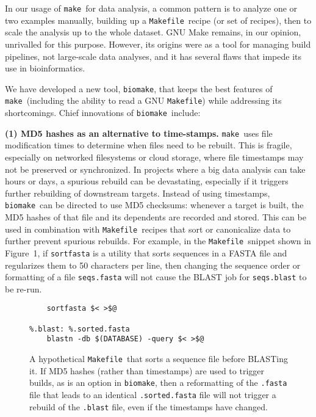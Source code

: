 \documentclass{bioinfo}
\newcommand\Makefile{{\tt Makefile}}
\newcommand\make{{\tt make}}
\newcommand\biomake{{\tt biomake}}
\begin{document}
In our usage of \make\ for data analysis, a common pattern is to analyze one or two examples manually, building up a \Makefile\ recipe (or set of recipes),
then to scale the analysis up to the whole dataset.
GNU Make remains, in our opinion, unrivalled for this purpose.
However, its origins were as a tool for managing build pipelines, not large-scale data analyses, and it has several flaws that impede its use in bioinformatics.

We have developed a new tool, \biomake, that keeps the best features of \make\ (including the ability to read a GNU \Makefile) while addressing its shortcomings.
Chief innovations of \biomake\ include:

{\bf (1) MD5 hashes as an alternative to time-stamps.}
\make\ uses file modification times to determine when files need to be rebuilt.
This is fragile, especially on networked filesystems or cloud storage, where file timestamps may not be preserved or synchronized.
In projects where a big data analysis can take hours or days, a spurious rebuild can be devastating, especially if it triggers further rebuilding of downstream targets.
Instead of using timestamps, \biomake\ can be directed to use MD5 checksums: whenever a target is built, the MD5 hashes of that file and its dependents are recorded
and stored. This can be used in combination with \Makefile\ recipes that sort or canonicalize data to further prevent spurious rebuilds.
For example, in the \Makefile\ snippet shown in Figure~1,
if {\tt sortfasta} is a utility that sorts sequences in a FASTA file and regularizes them to 50 characters per line, then changing the sequence order or formatting
of a file {\tt seqs.fasta} will not cause the BLAST job for {\tt seqs.blast} to be re-run.

\begin{figure}[H]
\begin{Verbatim}[frame=single]
%.sorted.fasta: %.fasta
    sortfasta $< >$@

%.blast: %.sorted.fasta
    blastn -db $(DATABASE) -query $< >$@
\end{Verbatim}
\caption{
  A hypothetical \Makefile\ that sorts a sequence file before BLASTing it.
  If MD5 hashes (rather than timestamps) are used to trigger builds, as is an option in \biomake,
  then a reformatting of the {\tt .fasta} file that leads to an identical {\tt .sorted.fasta} file
  will not trigger a rebuild of the {\tt .blast} file, even if the timestamps have changed.
}
\end{figure}
\end{document}

